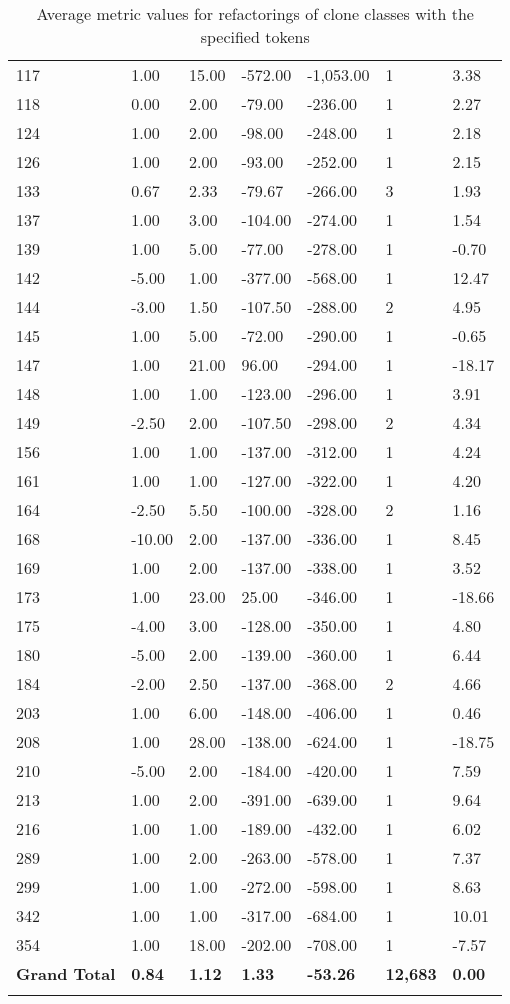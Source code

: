 \begin{appendices}
\begin{longtable}[c]{@{}lllllll@{}}
117 & 1.00 & 15.00 & -572.00 & -1,053.00 & 1 & 3.38 \\
118 & 0.00 & 2.00 & -79.00 & -236.00 & 1 & 2.27 \\
124 & 1.00 & 2.00 & -98.00 & -248.00 & 1 & 2.18 \\
126 & 1.00 & 2.00 & -93.00 & -252.00 & 1 & 2.15 \\
133 & 0.67 & 2.33 & -79.67 & -266.00 & 3 & 1.93 \\
137 & 1.00 & 3.00 & -104.00 & -274.00 & 1 & 1.54 \\
139 & 1.00 & 5.00 & -77.00 & -278.00 & 1 & -0.70 \\
142 & -5.00 & 1.00 & -377.00 & -568.00 & 1 & 12.47 \\
144 & -3.00 & 1.50 & -107.50 & -288.00 & 2 & 4.95 \\
145 & 1.00 & 5.00 & -72.00 & -290.00 & 1 & -0.65 \\
147 & 1.00 & 21.00 & 96.00 & -294.00 & 1 & -18.17 \\
148 & 1.00 & 1.00 & -123.00 & -296.00 & 1 & 3.91 \\
149 & -2.50 & 2.00 & -107.50 & -298.00 & 2 & 4.34 \\
156 & 1.00 & 1.00 & -137.00 & -312.00 & 1 & 4.24 \\
161 & 1.00 & 1.00 & -127.00 & -322.00 & 1 & 4.20 \\
164 & -2.50 & 5.50 & -100.00 & -328.00 & 2 & 1.16 \\
168 & -10.00 & 2.00 & -137.00 & -336.00 & 1 & 8.45 \\
169 & 1.00 & 2.00 & -137.00 & -338.00 & 1 & 3.52 \\
173 & 1.00 & 23.00 & 25.00 & -346.00 & 1 & -18.66 \\
175 & -4.00 & 3.00 & -128.00 & -350.00 & 1 & 4.80 \\
180 & -5.00 & 2.00 & -139.00 & -360.00 & 1 & 6.44 \\
184 & -2.00 & 2.50 & -137.00 & -368.00 & 2 & 4.66 \\
203 & 1.00 & 6.00 & -148.00 & -406.00 & 1 & 0.46 \\
208 & 1.00 & 28.00 & -138.00 & -624.00 & 1 & -18.75 \\
210 & -5.00 & 2.00 & -184.00 & -420.00 & 1 & 7.59 \\
213 & 1.00 & 2.00 & -391.00 & -639.00 & 1 & 9.64 \\
216 & 1.00 & 1.00 & -189.00 & -432.00 & 1 & 6.02 \\
289 & 1.00 & 2.00 & -263.00 & -578.00 & 1 & 7.37 \\
299 & 1.00 & 1.00 & -272.00 & -598.00 & 1 & 8.63 \\
342 & 1.00 & 1.00 & -317.00 & -684.00 & 1 & 10.01 \\
354 & 1.00 & 18.00 & -202.00 & -708.00 & 1 & -7.57 \\* \midrule
\textbf{Grand Total} & \textbf{0.84} & \textbf{1.12} & \textbf{1.33} & \textbf{-53.26} & \textbf{12,683} & \textbf{0.00} \\* \bottomrule
\caption{Average metric values for refactorings of clone classes with the specified tokens}
\label{tab:full-tokens}\\
\end{longtable}


\end{appendices}
